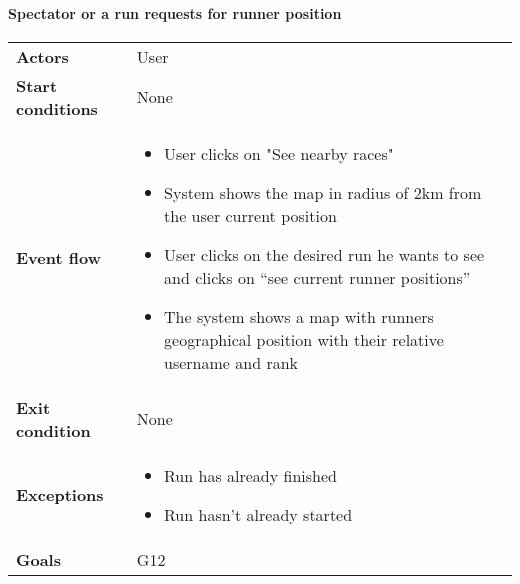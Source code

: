 \paragraph{Spectator or a run requests for runner position}
\begin{center}
\begin{table}[H]
\centering
\begin{tabular}{l|l}
\textbf{Actors} & User \\
\textbf{Start conditions} & None \\
\textbf{Event flow}  & \begin{minipage}[t]{0.7\textwidth}
    \begin{itemize}
       \item User clicks on "See nearby races"
\item System shows the map in radius of 2km from the user current position
\item User clicks on the desired run he wants to see and clicks on “see current runner positions”
\item The system shows a map with runners geographical position with their relative username and rank


    \end{itemize}
    
\end{minipage}  \\
\textbf{Exit condition} & None \\
\textbf{Exceptions} & \begin{minipage}[t]{0.7\textwidth}
    \begin{itemize}
       \item Run has already finished
\item Run hasn’t already started


    \end{itemize}
    
\end{minipage}  \\
\textbf{Goals} & G12 
\end{tabular}

\end{table}
\end{center}